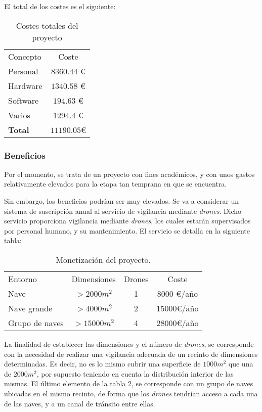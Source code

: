 El total de los costes es el siguiente: 
\begin{table}[H]
	\begin{center}
		\begin{tabular}{l | c}\hline
			\toprule
			Concepto & Coste\\
			\otoprule
			Personal & $8360.44$ \euro \\
			Hardware & $1340.58$ \euro \\
			Software & $194.63$ \euro\\
			Varios & $1294.4$ \euro\\
			\hline
			\textbf{Total} & $11190.05 $\euro\\
			\bottomrule
		\end{tabular}
		\caption{Costes totales del proyecto}
		\label{tb:costesTotales}
	\end{center}
\end{table}


\subsubsection{Beneficios}

Por el momento, se trata de un proyecto con fines académicos, y con unos gastos relativamente elevados para la etapa tan temprana en que se encuentra. 

Sin embargo, los beneficios podrían ser muy elevados. Se va a considerar un sistema de suscripción anual al servicio de vigilancia mediante \emph{drones}. Dicho servicio proporciona vigilancia mediante \emph{drones}, los cuales estarán supervisados por personal humano, y su mantenimiento. El servicio se detalla en la siguiente tabla: 
\begin{table}[H]
\begin{center}
		\begin{tabular}{l | c | c | c}\hline
			\toprule
			Entorno & Dimensiones & Drones & Coste\\
			\otoprule
			Nave & $>2000 m^2$ &  1 & $8000$ \euro/año\\
			Nave grande & $>4000 m^2$ & 2 & $15000 $\euro/año\\
			Grupo de naves & $>15000 m^2$ & 4 & $28000$\euro/año\\
			\hline
			\bottomrule
		\end{tabular}
		\caption{Monetización del proyecto.}
		\label{tb:money}
		\end{center}
\end{table}

La finalidad de establecer las dimensiones y el número de \emph{drones}, se corresponde con la necesidad de realizar una vigilancia adecuada de un recinto de dimensiones determinadas. Es decir, no es lo mismo cubrir una superficie de $1000m^2$ que una de $2000m^2$, por supuesto teniendo en cuenta la distribución interior de las mismas. 
El último elemento de la tabla \ref{tb:money}, se corresponde con un grupo de naves ubicadas en el mismo recinto, de forma que los \emph{drones} tendrían acceso a cada una de las naves, y a un canal de tránsito entre ellas. 

